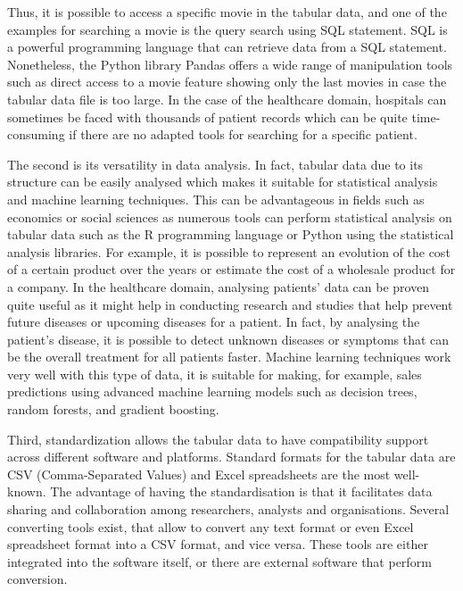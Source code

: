 \vspace{0.5cm}
Thus, it is possible to access a specific movie in the tabular data, and one of the examples for searching a movie is the query search using SQL statement. SQL is a powerful programming language that can retrieve data from a SQL statement. Nonetheless, the Python library Pandas offers a wide range of manipulation tools such as direct access to a movie feature showing only the last movies in case the tabular data file is too large. In the case of the healthcare domain, hospitals can sometimes be faced with thousands of patient records which can be quite time-consuming if there are no adapted tools for searching for a specific patient.

\vspace{0.5cm}
The second is its versatility in data analysis. In fact, tabular data due to its structure can be easily analysed which makes it suitable for statistical analysis and machine learning techniques. This can be advantageous in fields such as economics or social sciences as numerous tools can perform statistical analysis on tabular data such as the R programming language or Python using the statistical analysis libraries. For example, it is possible to represent an evolution of the cost of a certain product over the years or estimate the cost of a wholesale product for a company. In the healthcare domain, analysing patients' data can be proven quite useful as it might help in conducting research and studies that help prevent future diseases or upcoming diseases for a patient. In fact, by analysing the patient's disease, it is possible to detect unknown diseases or symptoms that can be the overall treatment for all patients faster. Machine learning techniques work very well with this type of data, it is suitable for making, for example, sales predictions using advanced machine learning models such as decision trees, random forests, and gradient boosting.

\vspace{0.5cm}
Third, standardization allows the tabular data to have compatibility support across different software and platforms. Standard formats for the tabular data are CSV (Comma-Separated Values) and Excel spreadsheets are the most well-known. The advantage of having the standardisation is that it facilitates data sharing and collaboration among researchers, analysts and organisations. Several converting tools exist, that allow to convert any text format or even Excel spreadsheet format into a CSV format, and vice versa. These tools are either integrated into the software itself, or there are external software that perform conversion.


